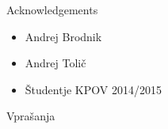 \documentclass{beamer}
\begin{document}
\begin{frame}{Acknowledgements}
  \begin{itemize}
    \item Andrej Brodnik
    \item Andrej Tolič
    \item Študentje KPOV 2014/2015
  \end{itemize}
\end{frame}

\begin{frame}{Vprašanja}
\end{frame}
  
\end{document}
